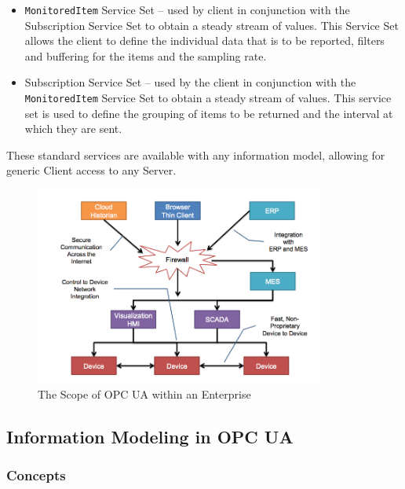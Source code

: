 \begin{itemize}
\item \texttt{MonitoredItem} Service Set -- used by client in conjunction with the Subscription Service Set to obtain a steady stream of values. This Service Set allows the client to define the individual data that is to be reported, filters and buffering for the items and the sampling rate.
\item Subscription Service Set -- used by the client in conjunction with the \texttt{Monitored\-Item} Service Set to obtain a steady stream of values. This service set is used to define the grouping of items to be returned and the interval at which they are sent.
\end{itemize}

These standard services are available with any information model, allowing for generic Client access to any Server.

\begin{figure}[h]
  \centering
  \includegraphics[width=0.85\textwidth]{diagrams/ScopeOfOpcUAEnt.png}
  \caption{The Scope of OPC UA within an Enterprise }
  \label{fig:scope_of_opcua}
\end{figure}

\subsection{Information Modeling in OPC UA}

\subsubsection{Concepts}

